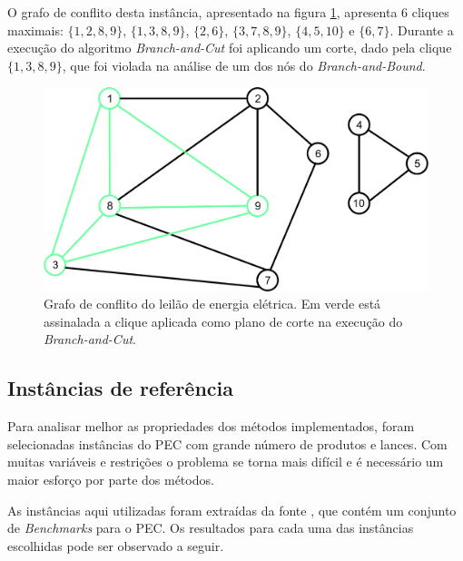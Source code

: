 \documentclass{article}
\begin{document}
    O grafo de conflito desta instância, apresentado na figura \ref{fig:instance}, apresenta 6 cliques maximais: $\{1, 2, 8, 9\}$, $\{1, 3, 8, 9\}$, $\{2, 6\}$, $\{3, 7, 8, 9\}$, $\{4, 5, 10\}$ e $\{6, 7\}$.
    Durante a execução do algoritmo \emph{Branch-and-Cut} foi aplicando um corte, dado pela clique $\{ 1, 3, 8, 9 \}$, que foi violada na análise de um dos nós do \emph{Branch-and-Bound}.
    
    \begin{figure}[H]
        \includegraphics[scale=0.65]{Imagens/GrafoClique.jpg}
             \centering
             \caption{Grafo de conflito do leilão de energia elétrica. Em verde está assinalada a clique aplicada como plano de corte na execução do \emph{Branch-and-Cut}.}
         \label{fig:instance}
    \end{figure} 

    \subsection{Instâncias de referência}
    
    Para analisar melhor as propriedades dos métodos implementados, 
    foram selecionadas instâncias do PEC com grande número de produtos e lances. Com muitas variáveis e restrições o problema se torna mais difícil e é necessário um maior esforço por parte dos métodos.
    
    As instâncias aqui utilizadas foram extraídas da fonte \cite{benchmarks}, que contém um conjunto de \emph{Benchmarks} para o PEC. Os resultados para cada uma das instâncias escolhidas pode ser observado a seguir. 
    
\end{document}
